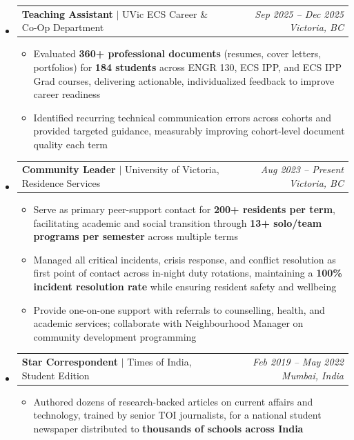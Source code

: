 \documentclass[10pt,letterpaper]{article}
\makeatletter
\newcommand{\resumeSubheading}[4]{
  \vspace{5pt}
  \item[]
    \begin{tabular*}{0.99\textwidth}[t]{l@{\extracolsep{\fill}}r}
      \textbf{\small #1} \textcolor{midgray}{$|$ \small #2} & \textcolor{midgray}{\textit{\small #3 \enspace #4}} \\
    \end{tabular*}
  \vspace{-2pt}
}
\newcommand{\resumeItem}[1]{
  \item {\small #1}
}
\makeatother
\begin{document}
\begin{itemize}[leftmargin=0in, label={}]
\begin{itemize}
    \resumeItem{Delivered 3 major production deployments via Azure DevOps and ServiceNow with \textbf{zero critical incidents} through end-to-end QA and comprehensive pre-release testing}
    \resumeItem{Enhanced MAMDA Virtual Care Account System by resolving user-syncing, deactivation, and account-visibility bugs, and extending backend logic for new account types to improve data accuracy across virtual care platforms}
    \resumeItem{Rebuilt mission-critical Device Services Tracker form using Plumsail/SharePoint, replacing unsupported legacy tooling with a standardized, accessible, and maintainable interface}
    \resumeItem{Developed Solution Registry \& Support Metadata Integration system capturing lifecycle metadata for internally built apps, enabling real-time status surfacing inside Power Apps and CMDB sync via SSIS pipelines}
  \end{itemize}

  \resumeSubheading
    {Teaching Assistant}{UVic ECS Career \& Co-Op Department}
    {Sep 2025 -- Dec 2025}{Victoria, BC}
  \begin{itemize}
    \resumeItem{Evaluated \textbf{360+ professional documents} (resumes, cover letters, portfolios) for \textbf{184 students} across ENGR 130, ECS IPP, and ECS IPP Grad courses, delivering actionable, individualized feedback to improve career readiness}
    \resumeItem{Identified recurring technical communication errors across cohorts and provided targeted guidance, measurably improving cohort-level document quality each term}
  \end{itemize}

  \resumeSubheading
    {Community Leader}{University of Victoria, Residence Services}
    {Aug 2023 -- Present}{Victoria, BC}
  \begin{itemize}
    \resumeItem{Serve as primary peer-support contact for \textbf{200+ residents per term}, facilitating academic and social transition through \textbf{13+ solo/team programs per semester} across multiple terms}
    \resumeItem{Managed all critical incidents, crisis response, and conflict resolution as first point of contact across in-night duty rotations, maintaining a \textbf{100\% incident resolution rate} while ensuring resident safety and wellbeing}
    \resumeItem{Provide one-on-one support with referrals to counselling, health, and academic services; collaborate with Neighbourhood Manager on community development programming}
  \end{itemize}


  \resumeSubheading
    {Star Correspondent}{Times of India, Student Edition}
    {Feb 2019 -- May 2022}{Mumbai, India}
  \begin{itemize}
    \resumeItem{Authored dozens of research-backed articles on current affairs and technology, trained by senior TOI journalists, for a national student newspaper distributed to \textbf{thousands of schools across India}}
  \end{itemize}


\end{itemize}
\end{document}
